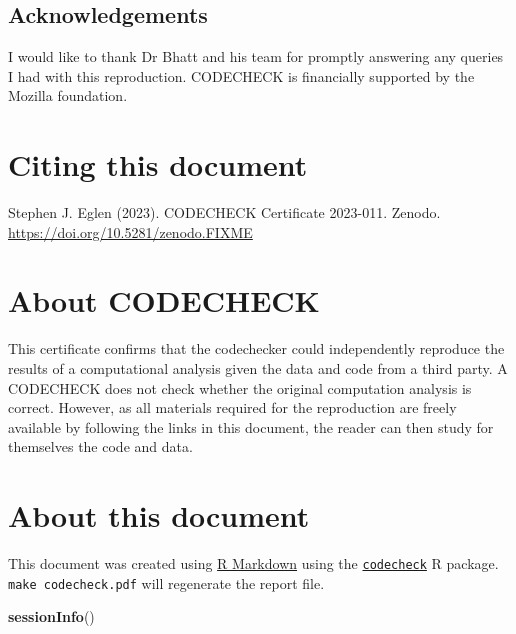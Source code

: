 \documentclass[
]{article}
\newenvironment{Shaded}{\begin{snugshade}}{\end{snugshade}}
\newcommand{\FunctionTok}[1]{\textcolor[rgb]{0.13,0.29,0.53}{\textbf{#1}}}
\newcommand{\NormalTok}[1]{#1}
\begin{document}
\clearpage

\subsection{Acknowledgements}\label{acknowledgements}

I would like to thank Dr Bhatt and his team for promptly answering any
queries I had with this reproduction. CODECHECK is financially supported
by the Mozilla foundation.

\section{Citing this document}\label{citing-this-document}

Stephen J. Eglen (2023). CODECHECK Certificate 2023-011. Zenodo.
\url{https://doi.org/10.5281/zenodo.FIXME}

\section{About CODECHECK}\label{about-codecheck}

This certificate confirms that the codechecker could independently
reproduce the results of a computational analysis given the data and
code from a third party. A CODECHECK does not check whether the original
computation analysis is correct. However, as all materials required for
the reproduction are freely available by following the links in this
document, the reader can then study for themselves the code and data.

\section{About this document}\label{about-this-document}

This document was created using \href{https://rmarkdown.rstudio.com/}{R
Markdown} using the
\href{https://github.com/codecheckers/codecheck}{\texttt{codecheck}} R
package. \texttt{make\ codecheck.pdf} will regenerate the report file.

\begin{Shaded}
\begin{Highlighting}[]
\FunctionTok{sessionInfo}\NormalTok{()}
\end{Highlighting}
\end{Shaded}
\end{document}
